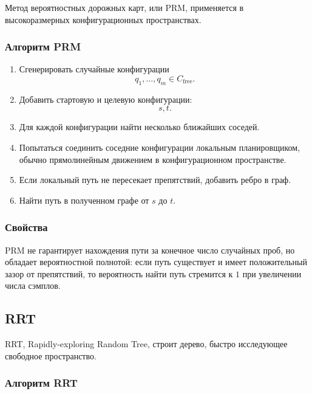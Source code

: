 \documentclass[12pt,a4paper]{article}
\begin{document}
Метод вероятностных дорожных карт, или PRM, применяется в высокоразмерных конфигурационных пространствах.

\subsubsection{Алгоритм PRM}

\begin{enumerate}
    \item Сгенерировать случайные конфигурации
    \[
    q_1,\dots,q_m\in C_{\text{free}}.
    \]
    \item Добавить стартовую и целевую конфигурации:
    \[
    s,t.
    \]
    \item Для каждой конфигурации найти несколько ближайших соседей.
    \item Попытаться соединить соседние конфигурации локальным планировщиком, обычно прямолинейным движением в конфигурационном пространстве.
    \item Если локальный путь не пересекает препятствий, добавить ребро в граф.
    \item Найти путь в полученном графе от \(s\) до \(t\).
\end{enumerate}

\subsubsection{Свойства}

PRM не гарантирует нахождения пути за конечное число случайных проб, но обладает вероятностной полнотой: если путь существует и имеет положительный зазор от препятствий, то вероятность найти путь стремится к \(1\) при увеличении числа сэмплов.

\subsection{RRT}

RRT, Rapidly-exploring Random Tree, строит дерево, быстро исследующее свободное пространство.

\subsubsection{Алгоритм RRT}
\end{document}
